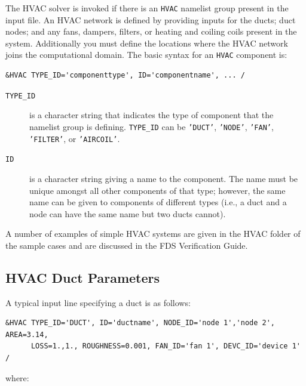 \documentclass[11pt]{book}
\newcommand{\ct}{\tt\small}
\begin{document}
The HVAC solver is invoked if there is an {\ct HVAC} namelist group present in the input file.
An HVAC network is defined by providing inputs for the ducts; duct nodes; and any fans, dampers, filters, or heating and coiling coils present in the system.
Additionally you must define the locations where the HVAC network joins the computational domain.  The basic syntax for an {\ct HVAC} component is:

\footnotesize
\begin{verbatim}
&HVAC TYPE_ID='componenttype', ID='componentname', ... /
\end{verbatim}\normalsize


\begin{description}
\item[{\ct TYPE\_ID}] is a character string that indicates the type of component that the namelist group is defining.   {\ct TYPE\_ID} can be {\ct 'DUCT'}, {\ct 'NODE'}, {\ct 'FAN'}, {\ct 'FILTER'}, or {\ct 'AIRCOIL'}.
\item[{\ct ID}] is a character string giving a name to the component.  The name must be unique amongst all other components of that type; however, the same name can be given to components of different types (i.e., a duct and a node can have the same name but two ducts cannot).
\end{description}
A number of examples of simple HVAC systems are given in the HVAC folder of the sample cases and are discussed in the FDS Verification Guide.



\subsection{HVAC Duct Parameters}
\label{info:HVACduct}

A typical input line specifying a duct is as follows:

\footnotesize
\begin{verbatim}
&HVAC TYPE_ID='DUCT', ID='ductname', NODE_ID='node 1','node 2', AREA=3.14,
      LOSS=1.,1., ROUGHNESS=0.001, FAN_ID='fan 1', DEVC_ID='device 1' /
\end{verbatim}\normalsize

\noindent where:
\end{document}
